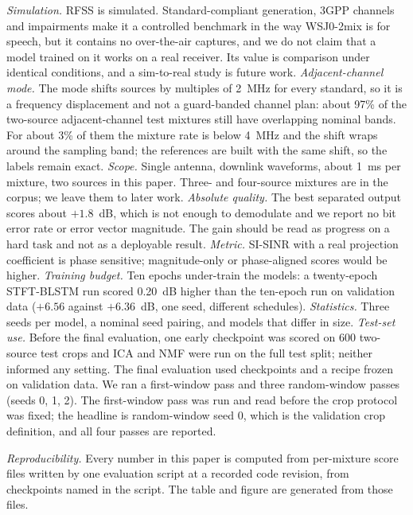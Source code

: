 \documentclass[conference]{IEEEtran}
\begin{document}
\textit{Simulation.} RFSS is simulated. Standard-compliant generation, 3GPP channels and impairments make it a controlled benchmark in the way WSJ0-2mix is for speech,
but it contains no over-the-air captures, and we do not claim that a model trained on it works on a real receiver. Its value is comparison under identical conditions, and a
sim-to-real study is future work.
\textit{Adjacent-channel mode.} The mode shifts sources by multiples of 2~MHz for every standard, so it is a frequency displacement and not a guard-banded channel plan: about 97\% of the two-source adjacent-channel test mixtures still have overlapping nominal bands. For about 3\% of them the mixture rate is below 4~MHz and the shift wraps around the sampling band; the references are built with the same shift, so the labels remain exact.
\textit{Scope.} Single antenna, downlink waveforms, about 1~ms per mixture, two sources in this paper. Three- and four-source mixtures are in the corpus; we leave them to later work.
\textit{Absolute quality.} The best separated output scores about $+1.8$~dB, which is not enough to demodulate and we report no bit error rate or error vector magnitude. The gain
should be read as progress on a hard task and not as a deployable result.
\textit{Metric.} SI-SINR with a real projection coefficient is phase sensitive; magnitude-only or phase-aligned scores would be higher.
\textit{Training budget.} Ten epochs under-train the models: a twenty-epoch STFT-BLSTM run scored 0.20~dB higher than the ten-epoch run on validation data ($+6.56$ against $+6.36$~dB, one seed, different schedules).
\textit{Statistics.} Three seeds per model, a nominal seed pairing, and models that differ in size.
\textit{Test-set use.} Before the final evaluation, one early checkpoint was scored on 600 two-source test crops and ICA and NMF were run on the full test split; neither informed any setting.
The final evaluation used checkpoints and a recipe frozen on validation data. We ran a first-window pass and three random-window passes (seeds 0, 1, 2). The first-window pass was run and read before the crop protocol was fixed; the headline is random-window seed 0, which is the validation crop definition, and all four passes are reported.

\textit{Reproducibility.} Every number in this paper is computed from per-mixture score files written by one evaluation script at a recorded code revision, from checkpoints named in the script.
The table and figure are generated from those files.

\end{document}
